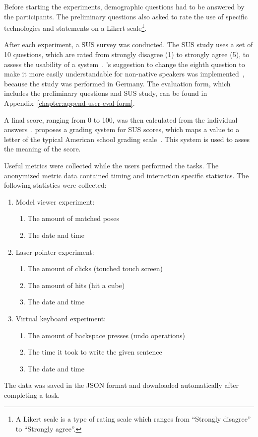 Before starting the experiments, demographic questions had to be answered by the participants. The preliminary questions also asked to rate the use of specific technologies and statements on a Likert scale\footnote{A Likert scale is a type of rating scale which ranges from \enquote{Strongly disagree} to \enquote{Strongly agree}.}. 

After each experiment, a \gls{SUS} survey was conducted. The \gls{SUS} study uses a set of 10 questions, which are rated from strongly disagree (1) to strongly agree (5), to assess the usability of a system~\cite[3]{Brooke.1996}. \citeauthor{Finstad.2006}'s suggestion to change the eighth question to make it more easily understandable for non-native speakers was implemented~\cite[188]{Finstad.2006}, because the study was performed in Germany. The evaluation form, which includes the preliminary questions and \gls{SUS} study, can be found in Appendix~\ref{chapter:append-user-eval-form}.

A final score, ranging from 0 to 100, was then calculated from the individual answers~\cite{Brooke.1996}. \citeauthor{Bangor.2009} proposes a grading system for \gls{SUS} scores, which maps a value to a letter of the typical American school grading scale~\cite{Bangor.2009}. This system is used to asses the meaning of the score.

Useful metrics were collected while the users performed the tasks. The anonymized metric data contained timing and interaction specific statistics. The following statistics were collected:
\begin{enumerate}
  \item Model viewer experiment:
  \begin{enumerate}
    \item The amount of matched poses
    \item The date and time
  \end{enumerate}

  \item Laser pointer experiment:
  \begin{enumerate}
    \item The amount of clicks (touched touch screen)
    \item The amount of hits (hit a cube)
    \item The date and time
  \end{enumerate}
  
  \item Virtual keyboard experiment:
  \begin{enumerate}
    \item The amount of backspace presses (undo operations)
    \item The time it took to write the given sentence
    \item The date and time
  \end{enumerate}
\end{enumerate}
The data was saved in the JSON format and downloaded automatically after completing a task.